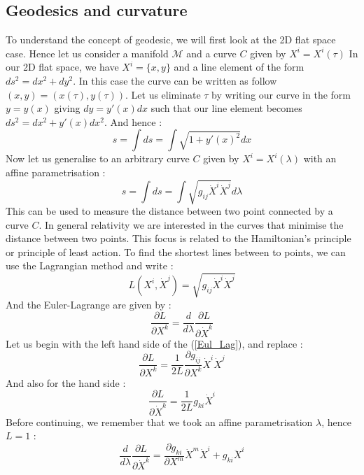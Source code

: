 \documentclass[a4paper,12pt]{article}
\theoremstyle{definition}
\begin{document}
\subsection{Geodesics and curvature}
To understand the concept of geodesic, we will first look at the 2D flat space case.
Hence let us consider a manifold $\mathcal{M}$ and a curve $C$ given by $X^i=X^i(\tau)$
In our 2D flat space, we have $X^i=\{x,y\}$ and a line element of the form $ds^2=dx^2+dy^2$.
In this case the curve can be written as follow $(x,y)=(x(\tau),y(\tau))$.
Let us eliminate $\tau$ by writing our curve in the form $y=y(x)$ giving $dy=y'(x)dx$ such that our line element becomes $ds^2=dx^2+y'(x)dx^2$.
And hence :
\begin{equation}
	s=\int ds=\int \sqrt{1+y'(x)^2}dx
\end{equation}
Now let us generalise to an arbitrary curve $C$ given by $X^i=X^i(\lambda)$ with an affine parametrisation :
\begin{equation}
	s=\int ds=\int \sqrt{g_{ij}\dot{X}^i\dot{X}^j}d\lambda
\end{equation}
This can be used to measure the distance between two point connected by a curve $C$.
In general relativity we are interested in the curves that minimise the distance between two points.
This focus is related to the Hamiltonian's principle or principle of least action.
To find the shortest lines between to points, we can use the Lagrangian method and write :
\begin{equation}
	L(X^i,\dot{X}^j)=\sqrt{g_{ij}\dot{X}^i\dot{X}^j}
\end{equation}
And the Euler-Lagrange are given by :
\begin{equation}\label{Eul_Lag}
	\frac{\partial L}{\partial X^k}=\frac{d}{d\lambda}\frac{\partial L}{\partial \dot{X}^k}
\end{equation}
Let us begin with the left hand side of the (\ref{Eul_Lag}), and replace :
\begin{equation}
	\frac{\partial L}{\partial X^k}=\frac{1}{2L}\frac{\partial g_{ij}}{\partial X^k}\dot{X}^i\dot{X}^j
\end{equation}
And also for the hand side :
\begin{equation}
	\frac{\partial L}{\partial \dot{X}^k}=\frac{1}{2L}g_{ki}\dot{X}^i
\end{equation}
Before continuing, we remember that we took an affine parametrisation $\lambda$, hence $L=1$ :
\begin{equation}
	\frac{d}{d\lambda}\frac{\partial L}{\partial \dot{X}^k}=
	\frac{\partial g_{ki}}{\partial X^m}\dot{X}^m\dot{X}^i+g_{ki}\ddot{X}^i
\end{equation}
\end{document}
